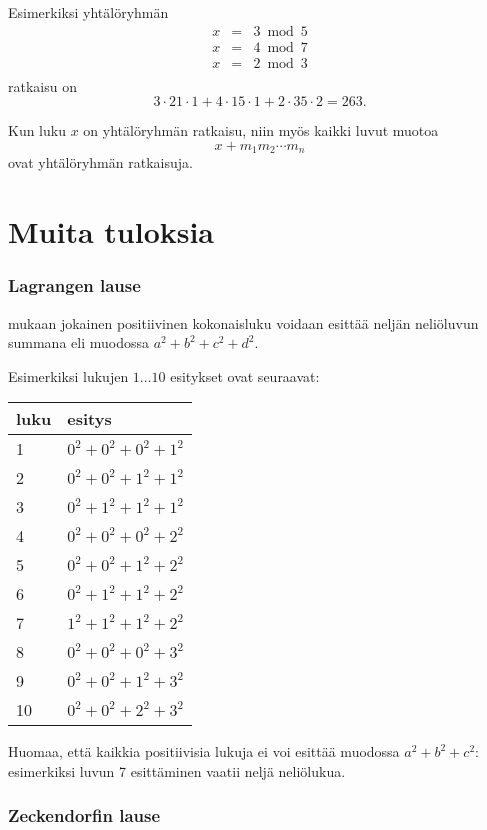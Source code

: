 Esimerkiksi yhtälöryhmän
\[
\begin{array}{lcl}
x & = & 3 \bmod 5 \\
x & = & 4 \bmod 7 \\
x & = & 2 \bmod 3 \\
\end{array}
\]
ratkaisu on
\[ 3 \cdot 21 \cdot 1 + 4 \cdot 15 \cdot 1 + 2 \cdot 35 \cdot 2 = 263.\]

Kun luku $x$ on yhtälöryhmän ratkaisu,
niin myös kaikki luvut muotoa
\[x+m_1 m_2 \cdots m_n\]
ovat yhtälöryhmän ratkaisuja.

\section{Muita tuloksia}

\subsubsection{Lagrangen lause}


 mukaan jokainen positiivinen kokonaisluku voidaan
esittää neljän neliöluvun summana eli muodossa $a^2+b^2+c^2+d^2$.

Esimerkiksi lukujen $1 \ldots 10$ esitykset ovat seuraavat:

\begin{center}
\begin{tabular}{ll}
luku & esitys \\
\hline
1 & $0^2+0^2+0^2+1^2$ \\
2 & $0^2+0^2+1^2+1^2$ \\
3 & $0^2+1^2+1^2+1^2$ \\
4 & $0^2+0^2+0^2+2^2$ \\
5 & $0^2+0^2+1^2+2^2$ \\
6 & $0^2+1^2+1^2+2^2$ \\
7 & $1^2+1^2+1^2+2^2$ \\
8 & $0^2+0^2+0^2+3^2$ \\
9 & $0^2+0^2+1^2+3^2$ \\
10 & $0^2+0^2+2^2+3^2$ \\
\end{tabular}
\end{center}
Huomaa, että kaikkia positiivisia lukuja ei voi esittää
muodossa $a^2+b^2+c^2$: esimerkiksi luvun 7
esittäminen vaatii neljä neliölukua.

\subsubsection{Zeckendorfin lause}

